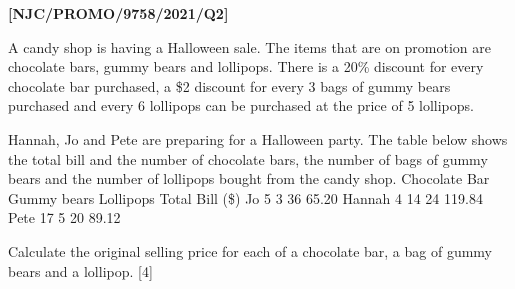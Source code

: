\item \textbf{{[}NJC/PROMO/9758/2021/Q2{]} }

A candy shop is having a Halloween sale. The items that are on promotion
are chocolate bars, gummy bears and lollipops. There is a 20\% discount
for every chocolate bar purchased, a \$2 discount for every 3 bags
of gummy bears purchased and every 6 lollipops can be purchased at
the price of 5 lollipops.

Hannah, Jo and Pete are preparing for a Halloween party. The table
below shows the total bill and the number of chocolate bars, the number
of bags of gummy bears and the number of lollipops bought from the
candy shop. Chocolate Bar Gummy bears Lollipops Total Bill (\$) Jo
5 3 36 65.20 Hannah 4 14 24 119.84 Pete 17 5 20 89.12

Calculate the original selling price for each of a chocolate bar,
a bag of gummy bears and a lollipop. {[}4{]}